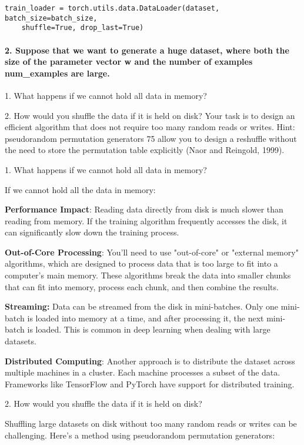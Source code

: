 \begin{verbatim}
train_loader = torch.utils.data.DataLoader(dataset, batch_size=batch_size,
    shuffle=True, drop_last=True)
\end{verbatim}

\paragraph{2. Suppose that we want to generate a huge dataset, where both the size of the parameter vector w and the number of examples num\_examples are large.}

1. What happens if we cannot hold all data in memory?

2. How would you shuffle the data if it is held on disk? Your task is to design an eﬀicient algorithm that does not require too many random reads or writes.
Hint: pseudorandom permutation generators 75 allow you to design a reshuffle without the need to store the permutation table explicitly (Naor and Reingold, 1999).

1. What happens if we cannot hold all data in memory?

If we cannot hold all the data in memory:

 \textbf{Performance Impact}: Reading data directly from disk is much slower than reading from memory. If the training algorithm frequently accesses the disk, it can significantly slow down the training process.

 \textbf{Out-of-Core Processing}: You'll need to use "out-of-core" or "external memory" algorithms, which are designed to process data that is too large to fit into a computer's main memory.
 These algorithms break the data into smaller chunks that can fit into memory, process each chunk, and then combine the results.

\textbf{Streaming:} Data can be streamed from the disk in mini-batches.
Only one mini-batch is loaded into memory at a time, and after processing it, the next mini-batch is loaded.
This is common in deep learning when dealing with large datasets.

 \textbf{Distributed Computing}: Another approach is to distribute the dataset across multiple machines in a cluster.
 Each machine processes a subset of the data. Frameworks like TensorFlow and PyTorch have support for distributed training.

2. How would you shuffle the data if it is held on disk?

Shuffling large datasets on disk without too many random reads or writes can be challenging. Here's a method using pseudorandom permutation generators:

